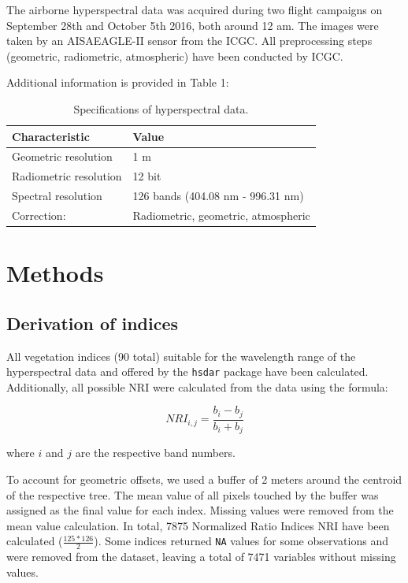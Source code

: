 \documentclass[review]{elsarticle}
\begin{document}
The airborne hyperspectral data was acquired during two flight campaigns on September 28th and October 5th 2016, both around 12 am.
The images were taken by an AISAEAGLE-II sensor from the \ac{ICGC}.
All preprocessing steps (geometric, radiometric, atmospheric) have been conducted by \ac{ICGC}.

Additional information is provided in Table 1:

\begin{table}[b!]
\centering
\caption[t]{Specifications of hyperspectral data.}
\begingroup\footnotesize
\begin{tabular}{ll}
	\\
	Characteristic         & Value                               \\
	\hline
	Geometric resolution   & 1 m                                 \\
	Radiometric resolution & 12 bit                              \\
	Spectral resolution    & 126 bands (404.08 nm - 996.31 nm)   \\
	Correction:            & Radiometric, geometric, atmospheric
\end{tabular}
\endgroup
\label{tab:hyperparameter_limits}
\end{table}

\section{Methods}

\subsection{Derivation of indices}

All vegetation indices (90 total) suitable for the wavelength range of the hyperspectral data and offered by the \texttt{hsdar} package have been calculated.
Additionally, all possible \ac{NRI} were calculated from the data using the formula:

\begin{equation}
	NRI_{i,j} = \frac{b_{i} - b_{j}}{b_{i} + b_{j}}
\end{equation}

\noindent
where $i$ and $j$ are the respective band numbers.

To account for geometric offsets, we used a buffer of 2 meters around the centroid of the respective tree.
The mean value of all pixels touched by the buffer was assigned as the final value for each index.
Missing values were removed from the mean value calculation.
In total, 7875 Normalized Ratio Indices NRI have been calculated ($\frac{125*126}{2}$).
Some indices returned \texttt{NA} values for some observations and were removed from the dataset, leaving a total of 7471 variables without missing values.
\end{document}
